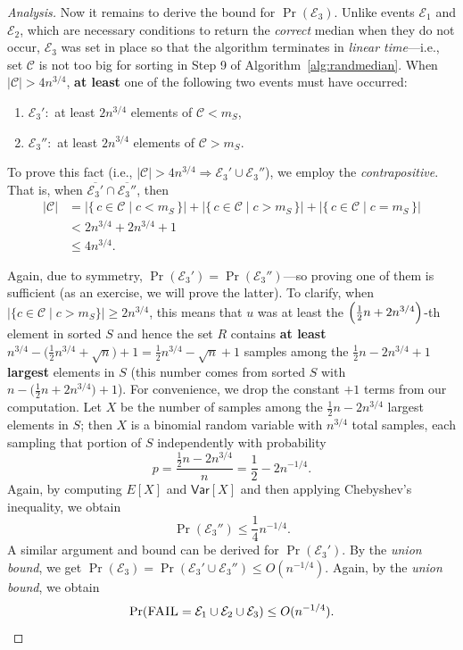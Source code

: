 \documentclass[12pt,a4paper]{article}
\newenvironment{analysis}[1][Analysis]%
{\begin{proof}[#1]}%
	{\end{proof}}
\begin{document}
\begin{analysis}
		Now it remains to derive the bound for \(\Pr(\mathcal{E}_3)\). Unlike events \(\mathcal{E}_1\) and \(\mathcal{E}_2\), which are necessary conditions to return the \emph{correct} median when they do not occur, \(\mathcal{E}_3\) was set in place so that the algorithm terminates in \emph{linear time}—i.e., set \(\mathcal{C}\) is not too big for sorting in Step 9 of Algorithm~\ref{alg:randmedian}. When \(|\mathcal{C}| > 4n^{3/4}\), \textbf{at least} one of the following two events must have occurred:
		\begin{enumerate}
			\item \(\mathcal{E}_3':\) at least \(2n^{3/4}\) elements of \(\mathcal{C} < m_S\),
			\item \(\mathcal{E}_3'':\) at least \(2n^{3/4}\) elements of \(\mathcal{C} > m_S\).
		\end{enumerate}
		
		To prove this fact (i.e., \(|\mathcal{C}| > 4n^{3/4} \Rightarrow \mathcal{E}_3' \cup \mathcal{E}_3''\)), we employ the \emph{contrapositive}. That is, when \(\overline{\mathcal{E}_3'}\cap\overline{\mathcal{E}_3''}\), then 
		\begin{align*}
			|\mathcal{C}| &= \bigl|\{\,c \in \mathcal{C} \mid c < m_S\,\}\bigr| + \bigl|\{\,c \in \mathcal{C} \mid c > m_S\,\}\bigr| + \bigl|\{\,c \in \mathcal{C} \mid c = m_S\,\}\bigr|\\
			&< 2n^{3/4} + 2n^{3/4} + 1\\
			&\le 4n^{3/4}.
		\end{align*}
		
		Again, due to symmetry, \(\Pr(\mathcal{E}_3') = \Pr(\mathcal{E}_3'')\)—so proving one of them is sufficient (as an exercise, we will prove the latter). To clarify, when \(|\{c \in \mathcal{C} \mid c > m_S\}| \ge 2n^{3/4}\), this means that \(u\) was at least the \(\Bigl(\tfrac{1}{2}n+2n^{3/4}\Bigr)\)-th element in sorted \(S\) and hence the set \(R\) contains \textbf{at least} \(n^{3/4}-\bigl(\tfrac{1}{2}n^{3/4}+\sqrt{n}\bigr)+1=\tfrac{1}{2}n^{3/4}-\sqrt{n}+1\) samples among the \(\tfrac{1}{2}n-2n^{3/4}+1\) \textbf{largest} elements in \(S\) (this number comes from sorted \(S\) with \(n-\bigl(\tfrac{1}{2}n+2n^{3/4}\bigr)+1\)). For convenience, we drop the constant \(+1\) terms from our computation. Let \(X\) be the number of samples among the \(\tfrac{1}{2}n-2n^{3/4}\) largest elements in \(S\); then \(X\) is a binomial random variable with \(n^{3/4}\) total samples, each sampling that portion of \(S\) independently with probability
		\[
		p = \frac{\tfrac{1}{2}n-2n^{3/4}}{n} = \frac{1}{2} - 2n^{-1/4}.
		\]
		Again, by computing \(E[X]\) and \(\mathsf{Var}[X]\) and then applying Chebyshev's inequality, we obtain
		\[
		\Pr(\mathcal{E}_3'') \le \frac{1}{4}n^{-1/4}.
		\]
		A similar argument and bound can be derived for \(\Pr(\mathcal{E}_3')\). By the \emph{union bound}, we get \(\Pr(\mathcal{E}_3) = \Pr(\mathcal{E}_3' \cup \mathcal{E}_3'') \le O(n^{-1/4})\). Again, by the \emph{union bound}, we obtain
		\[
		\Pr(\textsc{FAIL} = \mathcal{E}_1 \cup \mathcal{E}_2 \cup \mathcal{E}_3) \le O(n^{-1/4}).
		\]
		

\end{analysis}
\end{document}

